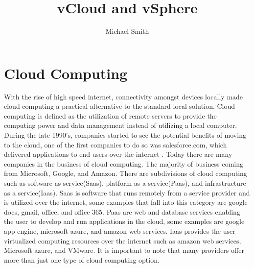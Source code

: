 \documentclass[9pt,twocolumn,twoside]{../../styles/osajnl}
\title{vCloud and vSphere}
\author[1] {Michael Smith}
\affil[1]{School of Informatics and Computing, Bloomington, IN 47408, U.S.A.}
\affil[*]{Corresponding authors: mls35@iu.edu}
\begin{document}
\maketitle

\section{Cloud Computing}

With the rise of high speed internet, connectivity amongst devices
locally made cloud computing a practical alternative to the standard
local solution.  Cloud computing is defined as the utilization of
remote servers to provide the computing power and data management
instead of utilizing a local computer.  During the late 1990's,
companies started to see the potential benefits of moving to the
cloud, one of the first companies to do so was salesforce.com, which
delivered applications to end users over the internet \cite{www-eci}.
Today there are many companies in the business of cloud computing.
The majority of business coming from Microsoft, Google, and Amazon.
There are subdivisions of cloud computing such as software as
service(Saas), platform as a service(Paas), and infrastructure as a
service(Iaas).  Saas is software that runs remotely from a service
provider and is utilized over the internet, some examples that fall
into this category are google docs, gmail, office, and office 365.
Paas are web and database services enabling the user to develop and
run applications in the cloud, some examples are google app engine,
microsoft azure, and amazon web services.  Iaas provides the user
virtualized computing resources over the internet such as amazon web
services, Microsoft azure, and VMware.  It is important to note that
many providers offer more than just one type of cloud computing
option\cite{www-rackspace}.
\end{document}
